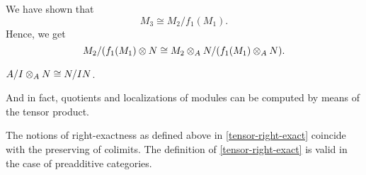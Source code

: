 \begin{note}
  We have shown that
  \[M_3 \cong M_2 /{f_1(M_1)}.\]
  Hence, we get
  \[ M_2 / {(f_1(M_1)} \otimes N \cong M_2 \otimes_A N /{(f_1(M_1) \otimes_A N)}.\]
\end{note}

\begin{example}
  $A /{I} \otimes_A N \cong N /{IN}$.
\end{example}
And in fact, quotients and localizations of modules can be computed by means of the tensor product.

\begin{note}
  The notions of right-exactness as defined above in \cref{tensor-right-exact} coincide with the preserving of colimits. The definition of \cref{tensor-right-exact} is valid in the case of preadditive categories.
\end{note}


